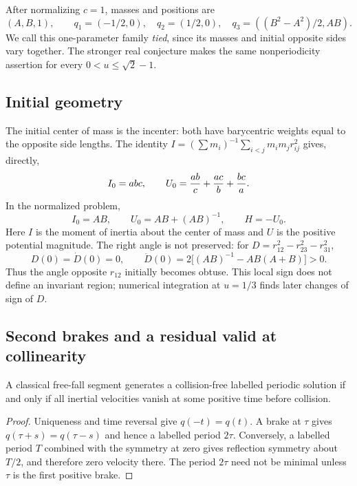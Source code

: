 After normalizing $c=1$, masses and positions are
\[
(A,B,1),\qquad q_1=(-1/2,0),\quad q_2=(1/2,0),\quad
q_3=((B^2-A^2)/2,AB).
\]
We call this one-parameter family \emph{tied}, since its masses and initial
opposite sides vary together. The stronger real conjecture makes the same
nonperiodicity assertion for every $0<u\le\sqrt2-1$.

\subsection{Initial geometry}

The initial center of mass is the incenter: both have barycentric weights
equal to the opposite side lengths. The identity
$I=(\sum m_i)^{-1}\sum_{i<j}m_im_jr_{ij}^2$ gives, directly,
\[
 I_0=abc,\qquad U_0={ab\over c}+{ac\over b}+{bc\over a}.
\]
In the normalized problem,
\[
 I_0=AB,\qquad U_0=AB+(AB)^{-1},\qquad H=-U_0.
\]
Here $I$ is the moment of inertia about the center of mass and $U$ is the
positive potential magnitude. The right angle is not preserved: for
$D=r_{12}^2-r_{23}^2-r_{31}^2$,
\[
 D(0)=\dot D(0)=0,\qquad
 \ddot D(0)=2\bigl[(AB)^{-1}-AB(A+B)\bigr]>0.
\]
Thus the angle opposite $r_{12}$ initially becomes obtuse. This local sign
does not define an invariant region; numerical integration at $u=1/3$
finds later changes of sign of $D$.

\subsection{Second brakes and a residual valid at collinearity}

\begin{lemma}
A classical free-fall segment generates a collision-free labelled periodic
solution if and only if all inertial velocities vanish at some positive time
before collision.
\end{lemma}
\begin{proof}
Uniqueness and time reversal give $q(-t)=q(t)$.  A brake at $\tau$ gives
$q(\tau+s)=q(\tau-s)$ and hence a labelled period $2\tau$.  Conversely, a
labelled period $T$ combined with the symmetry at zero gives reflection
symmetry about $T/2$, and therefore zero velocity there.  The period $2\tau$
need not be minimal unless $\tau$ is the first positive brake.
\end{proof}

